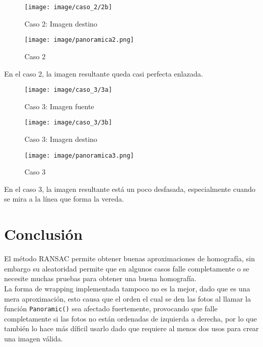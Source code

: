 \documentclass[conference]{IEEEtran}
\begin{document}
\begin{figure}[H]
    \centering
   \texttt{[image: image/caso\_2/2b]} \par \par

\caption{Caso 2: Imagen destino}
\end{figure}


\begin{figure}[H]
    \centering
    \texttt{[image: image/panoramica2.png]} \par

\caption{Caso 2}
\end{figure}

	En el caso 2, la imagen resultante queda casi perfecta enlazada.

\begin{figure}[H]
    \centering
    \texttt{[image: image/caso\_3/3a]} \par

\caption{Caso 3: Imagen fuente}
\end{figure}

\begin{figure}[H]
    \centering
   \texttt{[image: image/caso\_3/3b]} \par \par

\caption{Caso 3: Imagen destino}
\end{figure}


\begin{figure}[H]
    \centering
    \texttt{[image: image/panoramica3.png]} \par

\caption{Caso 3}
\end{figure}
	
	En el caso 3, la imagen resultante está un poco desfasada, especialmente cuando se mira a la línea que forma la vereda.
	
	
	
\section*{Conclusión}
	El método RANSAC permite obtener buenas aproximaciones de homografía, sin embargo su aleatoridad permite que en algunos casos falle completamente o se necesite muchas pruebas para obtener una buena homografía. \\
	La forma de wrapping implementada tampoco no es la mejor, dado que es una mera aproximación, esto causa que el orden el cual se den las fotos al llamar la función \texttt{Panoramic()} sea afectado fuertemente, provocando que falle completamente si las fotos no están ordenadas de izquierda a derecha, por lo que también lo hace más díficil usarlo dado que requiere al menos dos usos para crear una imagen válida.
	
\end{document}
